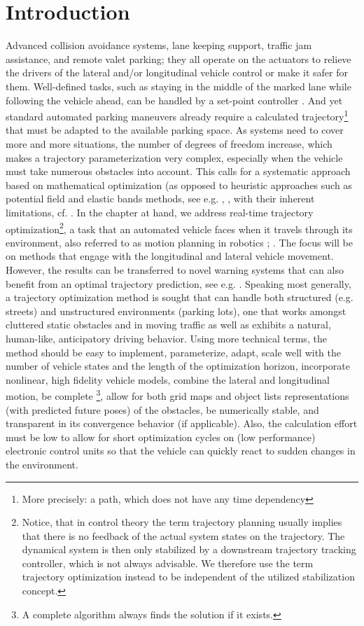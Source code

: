 \section{Introduction}\label{S:57.1}

Advanced collision avoidance systems, lane keeping support, traffic jam assistance, and remote valet parking; they all operate on the actuators to relieve the drivers of the lateral and/or longitudinal vehicle control or make it safer for them. Well-defined tasks, such as staying in the middle of the marked lane while following the vehicle ahead, can be handled by a set-point controller \cite{handbuchFAS_Gayko2012}. And yet standard automated parking maneuvers already require a calculated trajectory\footnote{More precisely: a path, which does not have any time dependency} that must be adapted to the available parking space. As systems need to cover more and more situations, the number of degrees of freedom increase, which makes a trajectory parameterization very complex, especially when the vehicle must take numerous obstacles into account. This calls for a systematic approach based on mathematical optimization (as opposed to heuristic approaches such as potential field and elastic bands methods, see e.g. \cite{krogh1984generalized}, \cite{Brandt2008}, with their inherent limitations, cf. \cite{koren1991potential}.
In the chapter at hand, we address real-time trajectory optimization\footnote{Notice, that in control theory the term trajectory planning usually implies that there is no feedback of the actual system states on the trajectory. The dynamical system is then only stabilized by a downstream trajectory tracking controller, which is not always advisable. We therefore use the term trajectory optimization instead to be independent of the utilized stabilization concept.}, a task that an automated vehicle faces when it travels through its environment, also referred to as motion planning in robotics \cite{latombe1990robot}; \cite{lavalle2006pa}. The focus will be on methods that engage with the longitudinal and lateral vehicle movement. However, the results can be transferred to novel warning systems that can also
benefit from an optimal trajectory prediction, see e.g. \cite{eichhorn2013Maneuverprediction}. 
Speaking most generally, a trajectory optimization method is sought that can handle both structured (e.g. streets) and unstructured environments (parking lots), one that works amongst cluttered static obstacles and in moving traffic as well as exhibits a natural, human-like, anticipatory driving behavior.
Using more technical terms, the method should be easy to implement, parameterize, adapt, scale well with the number of vehicle states and the length of the optimization horizon, incorporate nonlinear, high fidelity vehicle models, combine the lateral and longitudinal motion, be complete \footnote{A complete algorithm always finds the solution if it exists.}, allow for both grid maps and object lists representations (with predicted future poses) of the obstacles, be numerically stable, and transparent in its convergence behavior (if applicable). Also, the calculation effort must be low to allow for short optimization cycles on (low performance) electronic control units so that the vehicle can quickly react to sudden changes in the environment.
